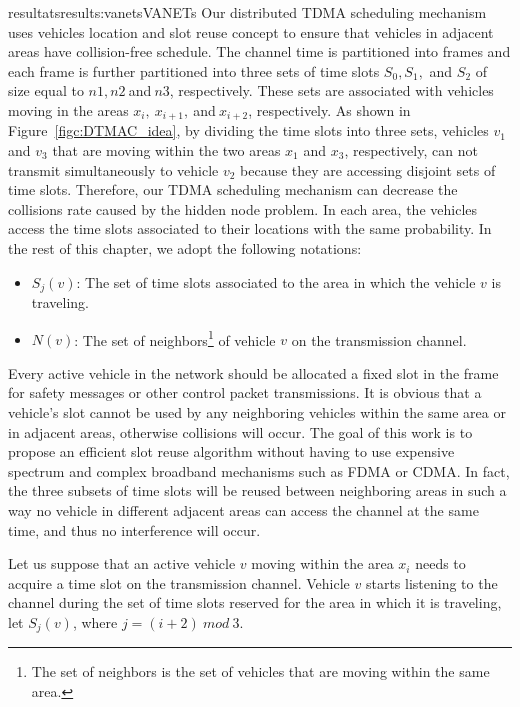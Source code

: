 \documentclass{ra2016}
\begin{document}
\begin{module}{resultats}{results:vanets}{VANETs}
Our distributed TDMA scheduling mechanism uses vehicles location and slot reuse concept to ensure that vehicles in 
adjacent areas have collision-free schedule. The channel time is partitioned into frames and each frame is further 
partitioned into three sets of time slots $S_0, S_1,$ and $S_2$ of size equal to $n1, n2~$and$~n3$, respectively. These sets 
are associated with vehicles moving in the areas $x_i,~x_{i+1},~$and$~x_{i+2}$, respectively. As shown in 
Figure~\ref{figc:DTMAC_idea}, by dividing the time slots into three sets, vehicles $v_1$ and $v_3$ that are moving 
within the two areas $x_1$ and $x_3$, respectively, can not transmit simultaneously to  vehicle $v_2$ because they 
are accessing disjoint sets of time slots. Therefore, our TDMA scheduling mechanism can decrease the collisions rate 
caused by the hidden node problem. In each area, the vehicles access the time slots associated to their locations 
with the same probability. In the rest of this chapter, we adopt the following notations:
\begin{itemize}
\item $S_{j}(v)$: The set of time slots associated to the area in which the vehicle $v$ is traveling. \vspace{1mm}
\item $N(v)$: The set of neighbors\footnote{The set of neighbors is the set of vehicles that are moving within the same area.} of vehicle $v$ on the transmission channel. \vspace{1mm}
\end{itemize}
Every active vehicle in the network should be allocated a fixed slot in the frame for safety messages or other control 
packet transmissions. It is obvious that a vehicle's slot cannot be used by any neighboring vehicles within the same area or in  adjacent areas, otherwise collisions will occur. The goal of this work is to propose an efficient slot reuse algorithm  without having to use expensive spectrum and complex broadband mechanisms such as FDMA or CDMA. In fact, the three subsets of time slots will be reused between neighboring areas in such a way no vehicle in different adjacent areas can access the channel at the same time, and thus no interference will occur. 


Let us suppose that an active vehicle $v$ moving within the area $x_i$ needs to acquire a time slot on the transmission channel. Vehicle $v$ starts listening to the channel during the set of time slots reserved for the area in which it is traveling, let $S_{j}(v)$, where $j=(i+2)~mod~3$.


\end{module}
\end{document}
